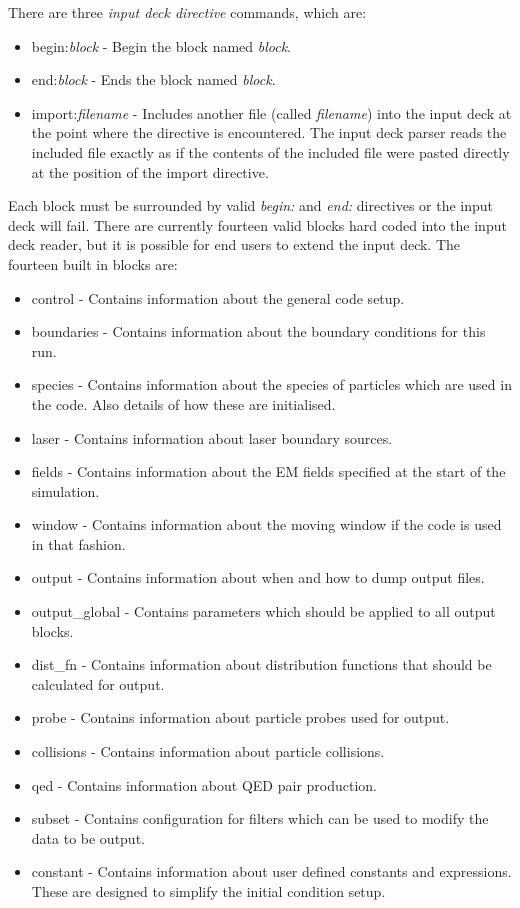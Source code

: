 \noindent There are three {\it input deck directive} commands, which are:
\begin{itemize}
\item begin:{\it block} - Begin the block named {\it block}.
\item end:{\it block} - Ends the block named {\it block}.
\item import:{\it filename} - Includes another file (called {\it filename})
  into the input deck at the point where the directive is encountered. The
  input deck parser reads the included file exactly as if the contents of the
  included file were pasted directly at the position of the import directive.
\end{itemize}
Each block must be surrounded by valid {\it begin:} and {\it end:} directives
or the input deck will fail. There are currently fourteen valid blocks hard
coded into the input deck reader, but it is possible for end users to extend
the input deck. The fourteen built in blocks are:
\begin{itemize}
\item control - Contains information about the general code setup.
\item boundaries - Contains information about the boundary conditions for this
  run.
\item species - Contains information about the species of particles which are
  used in the code. Also details of how these are initialised.
\item laser - Contains information about laser boundary sources.
\item fields - Contains information about the EM fields specified at the
  start of the simulation.
\item window - Contains information about the moving window if the code is
  used in that fashion.
\item output - Contains information about when and how to dump output files.
\item output\_global - Contains parameters which should be applied to all
  output blocks.
\item dist\_fn - Contains information about distribution functions that should
  be calculated for output.
\item probe - Contains information about particle probes used for output.
\item collisions - Contains information about particle collisions.
\item qed - Contains information about QED pair production.
\item subset - Contains configuration for filters which can be used to modify
  the data to be output.
\item constant - Contains information about user defined constants and
  expressions. These are designed to simplify the initial condition setup.
\end{itemize}

